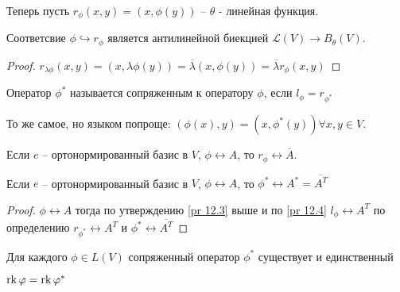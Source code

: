 \begin{definition}
    Теперь пусть $r_{\phi}(x, y) = (x, \phi(y))$ -- $\theta$ - линейная функция.
\end{definition}

\begin{corollary}
    Соответсвие $\phi \hookrightarrow r_{\phi}$ является антилинейной биекцией $\mathcal{L}(V) \to B_{\theta}(V)$.
\end{corollary}

\begin{proof}
    $r_{\lambda \phi} (x, y) = (x, \lambda \phi(y)) = \overline{\lambda} (x, \phi(y)) = \overline{\lambda} r_{\phi}(x, y)$
\end{proof}

\begin{definition}
    Оператор $\phi^*$ называется сопряженным к оператору $\phi$, если $l_{\phi} = r_{\phi^*}$
\end{definition}

\begin{definition}
    То же самое, но языком попроще: $(\phi(x), y) = (x, \phi^*(y)) \forall x, y \in V$.
\end{definition}

\begin{proposition}
    \label{pr 12.4}
    Если $e$ -- ортонормированный базис в $V$, $\phi \leftrightarrow A$, то $r_{\phi} \leftrightarrow \overline{A}$.
\end{proposition}

\begin{corollary}
    Если $e$ -- ортонормированный базис в $V$, $\phi \leftrightarrow A$, то $\phi^* \leftrightarrow A^* = \overline{A^T}$
\end{corollary}

\begin{proof}
    $\phi \leftrightarrow A$ тогда по утверждению \ref{pr 12.3} выше и по \ref{pr 12.4} $l_{\phi} \leftrightarrow A^T$ по определению $r_{\phi^*} \leftrightarrow A^T$ и $\phi^* \leftrightarrow \overline{A^T}$
\end{proof}

\begin{corollary}
    Для каждого $\phi \in L (V)$ сопряженный оператор $\phi^*$ существует и единственный
\end{corollary}

\begin{corollary}
    $\operatorname{rk} \varphi = \operatorname{rk} \varphi^*$
\end{corollary}

